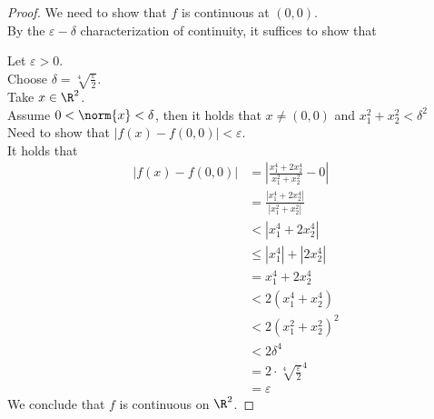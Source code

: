 \documentclass{assignment}
\begin{document}
\begin{proof}
    We need to show that $f$ is continuous at $(0,0)$. \\
    By the $\varepsilon-\delta$ characterization of continuity, it suffices to show that
    \begin{myCenter}
    \end{myCenter}
    Let $\varepsilon > 0$. \\
    Choose $\delta = \sqrt[4]{\frac{\varepsilon}{2}}$. \\
    Take $x \in \R^2$. \\
    Assume $0 < \norm{x} < \delta$, then it holds that $x \ne (0,0)$ and $x_1^2+x_2^2 < \delta^2$ \\ %
    Need to show that $|f(x) - f(0,0)|  < \varepsilon$. \\
    It holds that 
    \begin{align*}
        |f(x) - f(0,0)| &= \left|\frac{x_1^4+2x_2^4}{x_1^2+x_2^2} - 0\right| \\
                        &= \frac{|x_1^4 + 2x_2^4|}{|x_1^2 + x_2^2|} \\
                        &< |x_1^4 + 2x_2^4|  \\
                        &\le |x_1^4| + |2x_2^4| \\
                        &= x_1^4 + 2x_2^4 \\
                        &< 2(x_1^4 + x_2^4) \\
                        &< 2(x_1^2 + x_2^2)^2 \\
                        &< 2\delta^4 \\
                        &= 2\cdot \sqrt[4]{\frac{\varepsilon}{2}}^4 \\
                        &= \varepsilon
    \end{align*}
    We conclude that $f$ is continuous on $\R^2$.
\end{proof}
\end{document}
